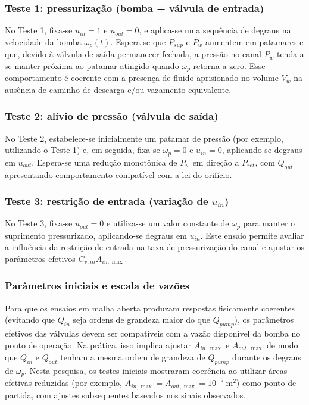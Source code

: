 \subsubsection{Teste 1: pressurização (bomba + válvula de entrada)}
\label{sec:controle-teste1}

No Teste 1, fixa-se $u_{in}=1$ e $u_{out}=0$, e aplica-se uma sequência de degraus na velocidade da bomba $\omega_p(t)$. Espera-se que $P_{sup}$ e $P_w$ aumentem em patamares e que, devido à válvula de saída permanecer fechada, a pressão no canal $P_w$ tenda a se manter próxima ao patamar atingido quando $\omega_p$ retorna a zero. Esse comportamento é coerente com a presença de fluido aprisionado no volume $V_w$ na ausência de caminho de descarga e/ou vazamento equivalente.

\subsubsection{Teste 2: alívio de pressão (válvula de saída)}
\label{sec:controle-teste2}

No Teste 2, estabelece-se inicialmente um patamar de pressão (por exemplo, utilizando o Teste 1) e, em seguida, fixa-se $\omega_p=0$ e $u_{in}=0$, aplicando-se degraus em $u_{out}$. Espera-se uma redução monotônica de $P_w$ em direção a $P_{ret}$, com $Q_{out}$ apresentando comportamento compatível com a lei do orifício.

\subsubsection{Teste 3: restrição de entrada (variação de $u_{in}$)}
\label{sec:controle-teste3}

No Teste 3, fixa-se $u_{out}=0$ e utiliza-se um valor constante de $\omega_p$ para manter o suprimento pressurizado, aplicando-se degraus em $u_{in}$. Este ensaio permite avaliar a influência da restrição de entrada na taxa de pressurização do canal e ajustar os parâmetros efetivos $C_{v,in}A_{in,\max}$.

\subsubsection{Parâmetros iniciais e escala de vazões}
\label{sec:controle-parametros-iniciais-ensaio}

Para que os ensaios em malha aberta produzam respostas fisicamente coerentes (evitando que $Q_{in}$ seja ordens de grandeza maior do que $Q_{pump}$), os parâmetros efetivos das válvulas devem ser compatíveis com a vazão disponível da bomba no ponto de operação. Na prática, isso implica ajustar $A_{in,\max}$ e $A_{out,\max}$ de modo que $Q_{in}$ e $Q_{out}$ tenham a mesma ordem de grandeza de $Q_{pump}$ durante os degraus de $\omega_p$. Nesta pesquisa, os testes iniciais mostraram coerência ao utilizar áreas efetivas reduzidas (por exemplo, $A_{in,\max}=A_{out,\max}=10^{-7}\ \text{m}^2$) como ponto de partida, com ajustes subsequentes baseados nos sinais observados.


